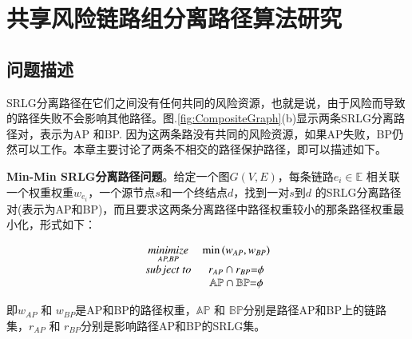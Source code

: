 \chapter{共享风险链路组分离路径算法研究}

\section{问题描述}
SRLG分离路径在它们之间没有任何共同的风险资源，也就是说，由于风险而导致的路径失败不会影响其他路径。图.\ref{fig:CompositeGraph}(b)显示两条SRLG分离路径对，表示为AP 和BP. 因为这两条路没有共同的风险资源，如果AP失败，BP仍然可以工作。本章主要讨论了两条不相交的路径保护路径，即可以描述如下。

\textbf{Min-Min SRLG分离路径问题}。给定一个图$G(V,E)$，每条链路$e_i\in \mathbb{E}$ 相关联一个权重权重$w_{e_i}$，一个源节点$s$和一个终结点$d$，找到一对$s$到$d$ 的SRLG分离路径对(表示为AP和BP)，而且要求这两条分离路径中路径权重较小的那条路径权重最小化，形式如下：

\begin{equation}
\begin{array}{*{20}{c}}
   {\mathop {minimize}\limits_{AP,BP} } & {\min \left( {{w_{AP}},{w_{BP}}} \right)}  \\
   {subject\ to} & {{r_{AP}} \cap {r_{BP}}{\rm{ = }}\phi }  \\
   {} & {\mathbb{AP} \cap \mathbb{BP}{\rm{ = }}\phi }  \\
\end{array}
\label{eq:problem definition}
\end{equation}

即${w_{AP}}$ 和 ${w_{BP}}$是AP和BP的路径权重，$\mathbb{AP}$ 和 $\mathbb{BP}$分别是路径AP和BP上的链路集，${r_{AP}}$ 和 ${r_{BP}}$分别是影响路径AP和BP的SRLG集。


